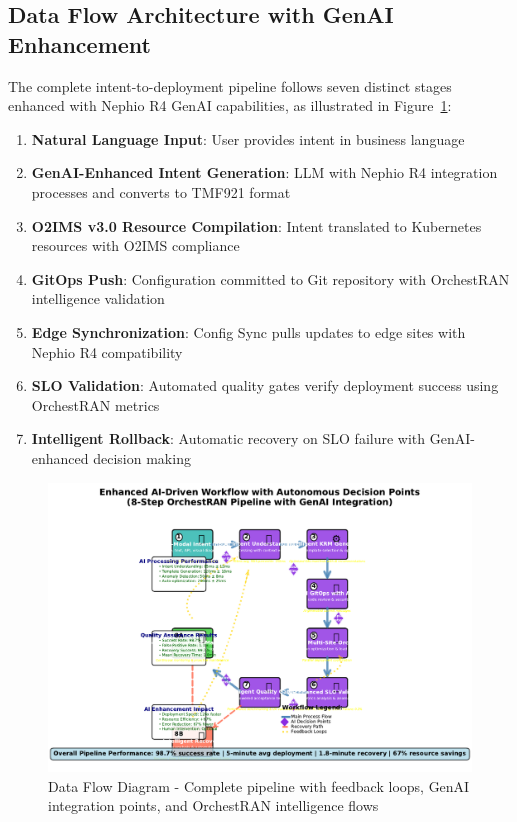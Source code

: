 \subsection{Data Flow Architecture with GenAI Enhancement}

The complete intent-to-deployment pipeline follows seven distinct stages enhanced with Nephio R4 GenAI capabilities, as illustrated in Figure~\ref{fig:dataflow}:

\begin{enumerate}
\item \textbf{Natural Language Input}: User provides intent in business language
\item \textbf{GenAI-Enhanced Intent Generation}: LLM with Nephio R4 integration processes and converts to TMF921 format
\item \textbf{O2IMS v3.0 Resource Compilation}: Intent translated to Kubernetes resources with O2IMS compliance
\item \textbf{GitOps Push}: Configuration committed to Git repository with OrchestRAN intelligence validation
\item \textbf{Edge Synchronization}: Config Sync pulls updates to edge sites with Nephio R4 compatibility
\item \textbf{SLO Validation}: Automated quality gates verify deployment success using OrchestRAN metrics
\item \textbf{Intelligent Rollback}: Automatic recovery on SLO failure with GenAI-enhanced decision making
\end{enumerate}

\begin{figure}[htbp]
\centering
\includegraphics[width=\columnwidth]{figures/figure6_ai_workflow.pdf}
\caption{Data Flow Diagram - Complete pipeline with feedback loops, GenAI integration points, and OrchestRAN intelligence flows}
\label{fig:dataflow}
\end{figure}